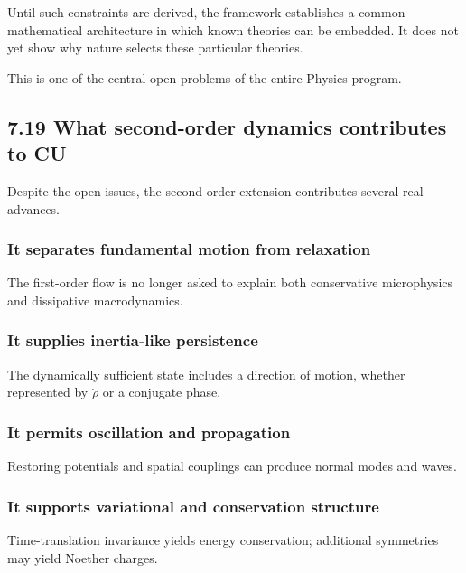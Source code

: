 \documentclass[
  11pt,
]{article}
\begin{document}
Until such constraints are derived, the framework establishes a common
mathematical architecture in which known theories can be embedded. It
does not yet show why nature selects these particular theories.

This is one of the central open problems of the entire Physics program.

\subsection{7.19 What second-order dynamics contributes to
CU}\label{what-second-order-dynamics-contributes-to-cu}

Despite the open issues, the second-order extension contributes several
real advances.

\subsubsection{It separates fundamental motion from
relaxation}\label{it-separates-fundamental-motion-from-relaxation}

The first-order flow is no longer asked to explain both conservative
microphysics and dissipative macrodynamics.

\subsubsection{It supplies inertia-like
persistence}\label{it-supplies-inertia-like-persistence}

The dynamically sufficient state includes a direction of motion, whether
represented by \(\dot\rho\) or a conjugate phase.

\subsubsection{It permits oscillation and
propagation}\label{it-permits-oscillation-and-propagation}

Restoring potentials and spatial couplings can produce normal modes and
waves.

\subsubsection{It supports variational and conservation
structure}\label{it-supports-variational-and-conservation-structure}

Time-translation invariance yields energy conservation; additional
symmetries may yield Noether charges.
\end{document}
